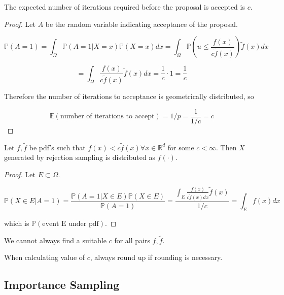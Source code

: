 \begin{lemma}
	The expected number of iterations required before the proposal is accepted is $c$.
\end{lemma}

\begin{proof}
	Let $A$ be the random variable indicating acceptance of the proposal.
	
	\[ \mathbb{P}(A = 1) = \int_{\Omega} \mathbb{P}(A = 1 | X = x) \mathbb{P}(X = x) dx = \int_{\Omega} \mathbb{P}(u \le \frac{f(x)}{c \tilde{f}(x)}) \tilde{f}(x) dx \]

	\[ = \int_{\Omega} \frac{f(x)}{c \tilde{f}(x)} \tilde{f}(x) dx = \frac{1}{c} \cdot 1 = \frac{1}{c} \]

	Therefore the number of iterations to acceptance is geometrically distributed, so

	\[\mathbb{E}(\text{number of iterations to accept}) = 1 / p = \frac{1}{1 / c} = c\]
\end{proof}

\begin{theorem}
	Let $f, \tilde{f}$ be pdf's such that $f(x) < c \tilde{f}(x) \forall x \in \mathbb{R}^d$ for some $c < \infty$. Then $X$ generated by rejection sampling is distributed as $f(\cdot)$.
\end{theorem}

\begin{proof}
	Let $E \subset \Omega$.
	
	\[ \mathbb{P}(X \in E | A = 1) = \frac{\mathbb{P}(A = 1 | X \in E) \mathbb{P}(X \in E)}{\mathbb{P}(A = 1)} = \frac{\int_E \frac{f(x)}{c \tilde{f}(x) dx} \tilde{f}(x)}{1 / c} = \int_E f(x) dx \]

	which is $\mathbb{P}(\text{event E under pdf})$.
\end{proof}

\begin{remark}
	We cannot always find a suitable $c$ for all pairs $f, \tilde{f}$.
\end{remark}

\begin{remark}
	When calculating value of $c$, always round up if rounding is necessary.
\end{remark}

\subsection{Importance Sampling}

